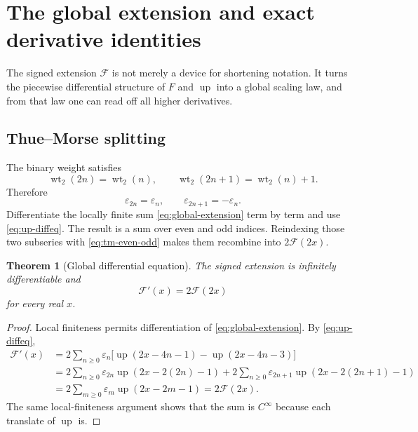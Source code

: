 \documentclass[11pt,oneside]{article}
\newtheorem{theorem}{Theorem}[section]
\theoremstyle{definition}
\theoremstyle{remark}
\newcommand{\Up}{\operatorname{up}}
\newcommand{\wt}{\operatorname{wt}_2}
\begin{document}
\section{The global extension and exact derivative identities}
\label{sec:global}

The signed extension $\mathcal F$ is not merely a device for shortening notation.  It turns
the piecewise differential structure of $F$ and $\Up$ into a global scaling law, and from
that law one can read off all higher derivatives.

\subsection{Thue--Morse splitting}

The binary weight satisfies
\begin{equation}
 \wt(2n)=\wt(n),\qquad \wt(2n+1)=\wt(n)+1.                \label{eq:weight-even-odd}
\end{equation}
Therefore
\begin{equation}
 \varepsilon_{2n}=\varepsilon_n,
 \qquad \varepsilon_{2n+1}=-\varepsilon_n.                \label{eq:tm-even-odd}
\end{equation}
Differentiate the locally finite sum \eqref{eq:global-extension} term by term and use
\eqref{eq:up-diffeq}.  The result is a sum over even and odd indices.  Reindexing those two
subseries with \eqref{eq:tm-even-odd} makes them recombine into $2\mathcal F(2x)$.

\begin{theorem}[Global differential equation]
The signed extension is infinitely differentiable and
\begin{equation}
 \mathcal F'(x)=2\mathcal F(2x)\label{eq:global-diffeq-again}
\end{equation}
for every real $x$.
\end{theorem}

\begin{proof}
Local finiteness permits differentiation of \eqref{eq:global-extension}.  By
\eqref{eq:up-diffeq},
\begin{align*}
 \mathcal F'(x)
 &=2\sum_{n\ge0}\varepsilon_n
   \bigl[\Up(2x-4n-1)-\Up(2x-4n-3)\bigr]\\
 &=2\sum_{n\ge0}\varepsilon_{2n}\Up(2x-2(2n)-1)
   +2\sum_{n\ge0}\varepsilon_{2n+1}\Up(2x-2(2n+1)-1)\\
 &=2\sum_{m\ge0}\varepsilon_m\Up(2x-2m-1)
 =2\mathcal F(2x).
\end{align*}
The same local-finiteness argument shows that the sum is $C^\infty$ because each translate
of $\Up$ is.
\end{proof}
\end{document}
